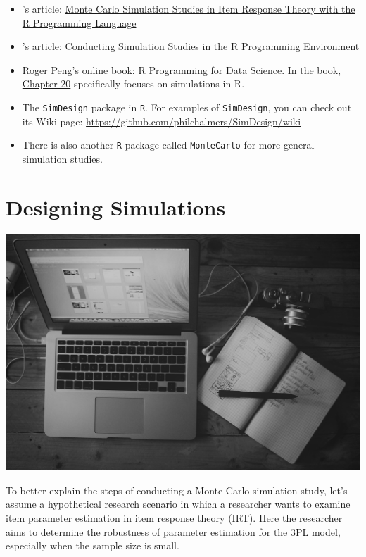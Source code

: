 \documentclass[
]{book}
\providecommand{\tightlist}{%
  \setlength{\itemsep}{0pt}\setlength{\parskip}{0pt}}
\begin{document}
\begin{itemize}
\tightlist
\item
  \citet{bulut2017}'s article: \href{https://dergipark.org.tr/en/download/article-file/343265}{Monte Carlo Simulation Studies in Item Response Theory with the R Programming Language}
\item
  \citet{hallgren_2013}'s article: \href{http://tqmp.org/Content/vol09-2/p043/p043.pdf}{Conducting Simulation Studies in the R Programming Environment}
\item
  Roger Peng's online book: \href{https://bookdown.org/rdpeng/rprogdatascience/}{R Programming for Data Science}. In the book, \href{https://bookdown.org/rdpeng/rprogdatascience/simulation.html}{Chapter 20} specifically focuses on simulations in R.
\item
  The \texttt{SimDesign} \citep{R-SimDesign} package in \texttt{R}. For examples of \texttt{SimDesign}, you can check out its Wiki page: \url{https://github.com/philchalmers/SimDesign/wiki}
\item
  There is also another \texttt{R} package called \texttt{MonteCarlo} \citep{R-MonteCarlo} for more general simulation studies.
\end{itemize}

\hypertarget{design}{%
\chapter{Designing Simulations}\label{design}}

\includegraphics{figure/galymzhan-abdugalimov-ICW6QYOcdlg-unsplash.jpg}

To better explain the steps of conducting a Monte Carlo simulation study, let's assume a hypothetical research scenario in which a researcher wants to examine item parameter estimation in item response theory (IRT). Here the researcher aims to determine the robustness of parameter estimation for the 3PL model, especially when the sample size is small.
\end{document}
